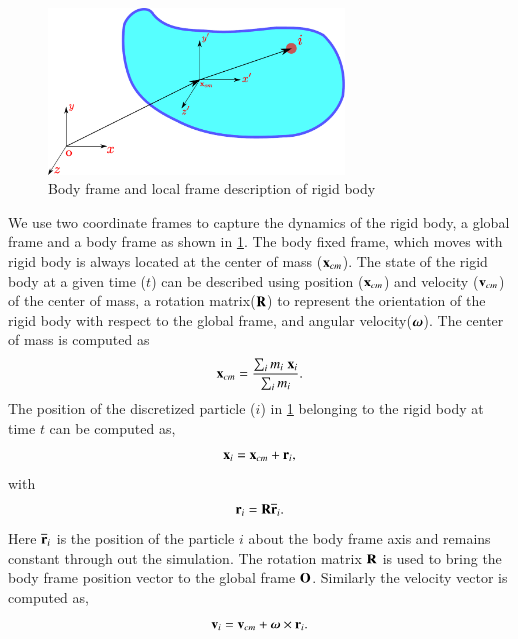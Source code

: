 \begin{figure}[!htpb]
  \centering
  \includegraphics[width=0.7\textwidth]{images/rfc/images/rigid_body/rigid_body}
  \caption{Body frame and local frame description of rigid body}
  \label{fig:gloabl_body_frame_rb}
\end{figure}
We use two coordinate frames to capture the dynamics of the rigid body, a
global frame and a body frame as shown in
\cref{fig:gloabl_body_frame_rb}. The body fixed frame, which moves with
rigid body is always located at the center of mass ($\mathbf{x}_{cm}$). The
state of the rigid body at a given time ($t$) can be described using position
($\mathbf{x}_{cm}$) and velocity ($\mathbf{v}_{cm}$) of the center of mass, a
rotation matrix($\mathbf{R}$) to represent the orientation of the rigid body with
respect to the global frame, and angular velocity($\boldsymbol{\omega}$). The center
of mass is computed as
\begin{equation}
  \label{eq:rfc:center_of_mass}
  \mathbf{x}_{cm} = \frac{\sum_i m_i \; \mathbf{x}_{i} }{\sum_i m_i }.
\end{equation}
The position of the discretized particle ($i$) in
\cref{fig:gloabl_body_frame_rb} belonging to the rigid body at time $t$ can be
computed as,
\begin{equation}
  \label{eq:rfc:rb_particle_pos_update}
  \mathbf{x}_i = \mathbf{x}_{cm} + \mathbf{r}_{i},
\end{equation}
with
\begin{equation}
  \label{eq:rfc:rb_particle_pos_update}
  \mathbf{r}_i = \mathbf{R} \overline{\mathbf{r}}_{i}.
\end{equation}
Here $\overline{\mathbf{r}}_{i}$ is the position of the particle $i$ about the body
frame axis and remains constant through out the simulation. The rotation matrix
$\mathbf{R}$ is used to bring the body frame position vector to the global frame
$\mathbf{O}$. Similarly the velocity vector is computed as,
\begin{equation}
  \label{eq:rfc:rb_particle_vel_update}
  \mathbf{v}_i = \mathbf{v}_{cm} + \boldsymbol{\omega} \times \mathbf{r}_{i}.
\end{equation}

